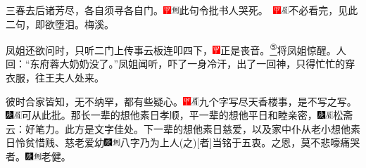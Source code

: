 三春去后诸芳尽，各自须寻各自门。{\includegraphics[width=3mm]{../Images/00002}\includegraphics[width=3mm]{../Images/00011}\footnotesize \kaishu 此句令批书人哭死。　\includegraphics[width=3mm]{../Images/00002}\includegraphics[width=3mm]{../Images/00010}\footnotesize \kaishu 不必看完，见此二句，即欲堕泪。梅溪。}

凤姐还欲问时，只听二门上传事云板连叩四下，{\includegraphics[width=3mm]{../Images/00002}正是丧音。}\href{../Text/part0017_split_000.html\#lnkback_5_a}{\textsuperscript{⑤}}将凤姐惊醒。人回：``东府蓉大奶奶没了。''凤姐闻听，吓了一身冷汗，出了一回神，只得忙忙的穿衣服，往王夫人处来。

彼时合家皆知，无不纳罕，都有些疑心。{\includegraphics[width=3mm]{../Images/00002}\includegraphics[width=3mm]{../Images/00010}\footnotesize \kaishu 九个字写尽天香楼事，是不写之写。　\includegraphics[width=3mm]{../Images/00004}\includegraphics[width=3mm]{../Images/00010}\footnotesize \kaishu 可从此批。}那长一辈的想他素日孝顺，平一辈的想他平日和睦亲密，{\includegraphics[width=3mm]{../Images/00004}\includegraphics[width=3mm]{../Images/00010}\footnotesize \kaishu 松斋云：好笔力。此方是文字佳处。}下一辈的想他素日慈爱，以及家中仆从老小想他素日怜贫惜贱、慈老爱幼{{\includegraphics[width=3mm]{../Images/00004}\includegraphics[width=3mm]{../Images/00011}\footnotesize \kaishu 八字乃为上人{(之)}{[}者{]}当铭于五衷。}}之恩，莫不悲嚎痛哭者。{\includegraphics[width=3mm]{../Images/00004}\includegraphics[width=3mm]{../Images/00011}\footnotesize \kaishu 老健。}

